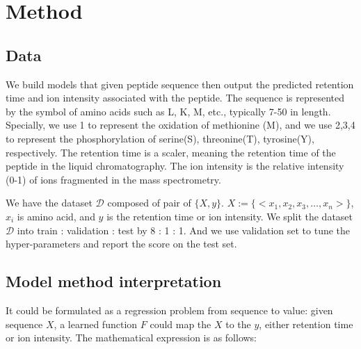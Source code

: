 \documentclass[final]{cvpr}
\begin{document}
\title{}

\author{Weizhen Liu\\
\\
{\tt\small liuwzh@shanghaitech.edu.cn}}

\maketitle

\section*{Method}

\subsection*{Data}

We build models that given peptide sequence then output the predicted retention time and ion intensity associated with
the peptide. The sequence is represented by the symbol of amino acids such as L, K, M, etc., typically 7-50 in length.
Specially, we use 1 to represent the oxidation of methionine (M), and we use 2,3,4 to represent the phosphorylation of
serine(S), threonine(T), tyrosine(Y), respectively. The retention time is a scaler, meaning the retention time of the 
peptide in the liquid chromatography. The ion intensity is the relative intensity (0-1) of ions fragmented in the mass 
spectrometry.

We have the dataset \( \mathcal{D} \) composed of pair of \( \{X, y\} \). $ X := \{ <x_1, x_2, x_3,\dots, x_n> \}$, $x_i$ is amino acid,
and \( y \) is the retention time or ion intensity. We split the dataset \( \mathcal{D} \) into train : validation : test by 8 : 1 : 1.
And we use validation set to tune the hyper-parameters and report the score on the test set.

\subsection*{Model method interpretation}

It could be formulated as a regression problem from sequence to value: given sequence \( X \), a learned 
function \( F \) could map the \( X \) to the \( y \), either retention time or ion intensity. The mathematical expression is as follows: 
\end{document}
